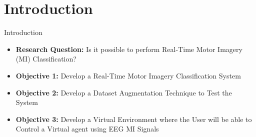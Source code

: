 \section{Introduction}
\begin{frame}{Introduction}
\begin{itemize}
    \item \textbf{Research Question:} Is it possible to perform Real-Time Motor Imagery (MI) Classification?
    \item \textbf{Objective 1:} Develop a Real-Time Motor Imagery Classification System
    \item \textbf{Objective 2:} Develop a Dataset Augmentation Technique to Test the System
    \item \textbf{Objective 3:} Develop a Virtual Environment where the User will be able to Control a Virtual agent using EEG MI Signals
\end{itemize}
\end{frame}